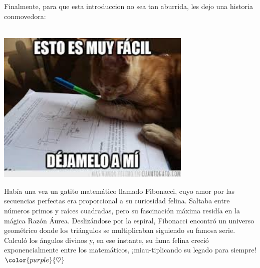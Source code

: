 \documentclass[a4paper]{article}
\newcommand{\myHearts}
 {$\color{purple}{\heartsuit}\kern-2.5pt$}
\begin{document}
Finalmente, para que esta introduccion no sea tan aburrida, les dejo una historia conmovedora: \\  \\


\begin{minipage}{0.4\linewidth}
    \includegraphics[width=0.7\textwidth]{Imagenes/gato.jpg}
\end{minipage}
\begin{minipage}{0.5\linewidth}
    Había una vez un gatito matemático llamado Fibonacci, cuyo amor por las secuencias perfectas era proporcional a su curiosidad felina. 
    Saltaba entre números primos y raíces cuadradas, pero su fascinación máxima residía en la mágica Razón Áurea. Deslizándose por la espiral,
    Fibonacci encontró un universo geométrico donde los triángulos se multiplicaban siguiendo su famosa serie. Calculó los ángulos divinos y,
    en ese instante, su fama felina creció exponencialmente entre los matemáticos, ¡miau-tiplicando su legado para siempre! \myHearts
\end{minipage}


















\end{document}
